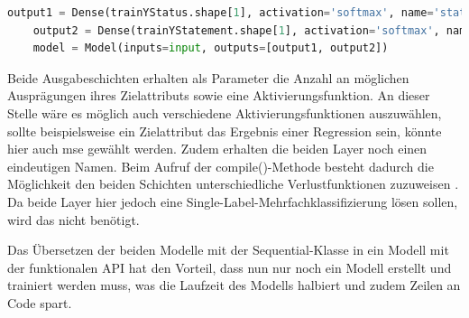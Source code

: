 \begin{lstlisting}[language = python, caption={Zweite Ausgabeschicht hinzufügen},captionpos=b, label = lst:Outputs, floatplacement=H]
    output1 = Dense(trainYStatus.shape[1], activation='softmax', name='status')(x)
    output2 = Dense(trainYStatement.shape[1], activation='softmax', name='statement')(x)
    model = Model(inputs=input, outputs=[output1, output2])
\end{lstlisting}

Beide Ausgabeschichten erhalten als Parameter die Anzahl an möglichen Ausprägungen ihres Zielattributs sowie eine Aktivierungsfunktion. An dieser Stelle wäre es möglich
auch verschiedene Aktivierungsfunktionen auszuwählen, sollte beispielsweise ein Zielattribut das Ergebnis einer Regression sein, könnte hier auch 
\glqq mse\grqq{} gewählt werden. Zudem erhalten die beiden Layer noch einen eindeutigen Namen. Beim Aufruf der compile()-Methode besteht dadurch die Möglichkeit 
den beiden Schichten unterschiedliche Verlustfunktionen zuzuweisen \cite[vgl. S.308f.]{DL_PY}. Da beide Layer hier jedoch eine Single-Label-Mehrfachklassifizierung lösen sollen,
wird das nicht benötigt. 

Das Übersetzen der beiden Modelle mit der \glqq Sequential\grqq{}-Klasse in ein Modell mit der funktionalen \ac{API} hat den Vorteil, dass nun nur noch ein Modell 
erstellt und trainiert werden muss, was die Laufzeit des Modells halbiert und zudem Zeilen an Code spart. 
